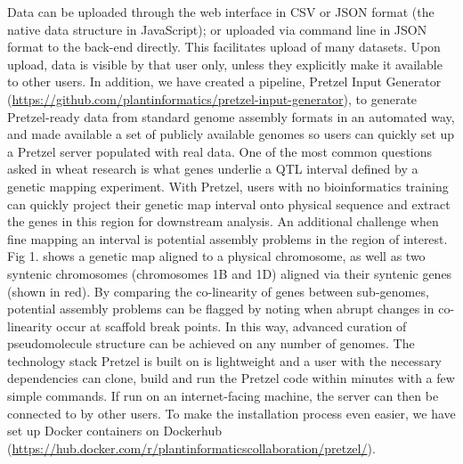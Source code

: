 \documentclass{bioinfo}
\begin{document}
\begin{methods}
Data can be uploaded through the web interface in CSV or JSON format (the native data structure in JavaScript); or uploaded via command line in JSON format to the back-end directly. 
This facilitates upload of many datasets. 
Upon upload, data is visible by that user only, unless they explicitly make it available to other users. 
In addition, we have created a pipeline, Pretzel Input Generator (\href{https://github.com/plantinformatics/pretzel-input-generator}{https://github.com/plantinformatics/pretzel-input-generator}), to generate Pretzel-ready data from standard genome assembly formats in an automated way, and made available a set of publicly available genomes so users can quickly set up a Pretzel server populated with real data.
One of the most common questions asked in wheat research is what genes underlie a QTL interval defined by a genetic mapping experiment. 
With Pretzel, users with no bioinformatics training can quickly project their genetic map interval onto physical sequence and extract the genes in this region for downstream analysis. 
An additional challenge when fine mapping an interval is potential assembly problems in the region of interest. Fig 1. shows a genetic map aligned to a physical chromosome, as well as two syntenic chromosomes (chromosomes 1B and 1D) aligned via their syntenic genes (shown in red). 
By comparing the co-linearity of genes between sub-genomes, potential assembly problems can be flagged by noting when abrupt changes in co-linearity occur at scaffold break points. 
In this way, advanced curation of pseudomolecule structure can be achieved on any number of genomes.
The technology stack Pretzel is built on is lightweight and a user with the necessary dependencies can clone, build and run the Pretzel code within minutes with a few simple commands. 
If run on an internet-facing machine, the server can then be connected to by other users. 
To make the installation process even easier, we have set up Docker containers on Dockerhub (\href{https://hub.docker.com/r/plantinformaticscollaboration/pretzel/}{https://hub.docker.com/r/plantinformaticscollaboration/pretzel/}).



\end{methods}
\end{document}
